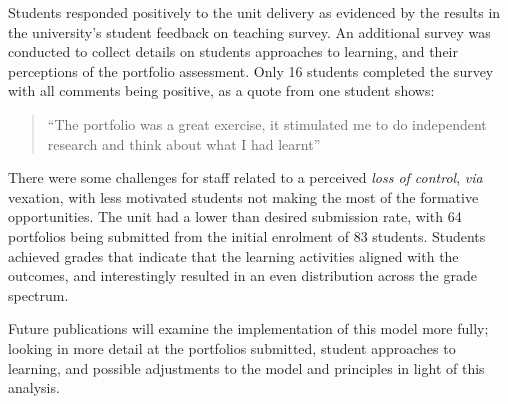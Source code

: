 Students responded positively to the unit delivery as evidenced by the results in the university's student feedback on teaching survey. An additional survey was conducted to collect details on students approaches to learning, and their perceptions of the portfolio assessment. Only 16 students completed the survey with all comments being positive, as a quote from one student shows: 

\begin{quote}
  ``The portfolio was a great exercise, it stimulated me to do independent research and think about what I had learnt''   
\end{quote}

There were some challenges for staff related to a perceived \emph{loss of control}, \emph{via} vexation, with less motivated students not making the most of the formative opportunities. The unit had a lower than desired submission rate, with 64 portfolios being submitted from the initial enrolment of 83 students. Students achieved grades that indicate that the learning activities aligned with the outcomes, and interestingly resulted in an even distribution across the grade spectrum.

Future publications will examine the implementation of this model more fully; looking in more detail at the portfolios submitted, student approaches to learning, and possible adjustments to the model and principles in light of this analysis.


